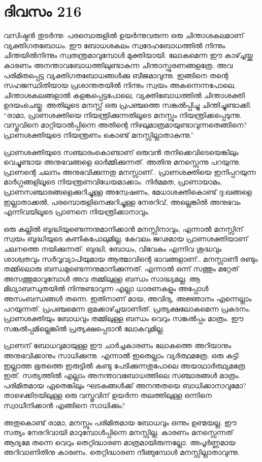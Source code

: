 \section{ദിവസം 216}


വസിഷ്ഠൻ തുടർന്നു: പരമ്പൊരുളിൽ ഉയർന്നുവരുന്ന ഒരു ചിന്താശകലമാണ്‌ വ്യക്തിഗതബോധം. ഈ ബോധശകലം സ്വദേഹബോധത്തിൽ നിന്നും ചിന്തയിൽനിന്നും സ്വതന്ത്രമാവുമ്പോൾ മുക്തിയായി. ലോകമെന്ന ഈ കാഴ്ച്ചയ്ക്കു കാരണം അനന്താവബോധത്തിലുണ്ടാകുന്ന ചിന്താസ്ഫുരണങ്ങളത്രേ. അവ പരിമിതപ്പെട്ട വ്യക്തിഗതബോധങ്ങൾക്കു ബീജമാവുന്നു. ഇങ്ങിനെ  തന്റെ സഹജസ്ഥിതിയായ പ്രശാന്തതയിൽ നിന്നും സ്വയം അകന്നെന്നപോലെ, ചിന്താശകലങ്ങളാൽ കളങ്കപ്പെട്ടപോലെ, വ്യക്തിബോധത്തിൽ ചിന്താശക്തി ഉദയംചെയ്തു. അതിലൂടെ മനസ്സ് ഒരു പ്രപഞ്ചത്തെ സങ്കല്‍പ്പിച്ചു ചിന്തിച്ചുണ്ടാക്കി. “രാമാ, പ്രാണശക്തിയെ നിയന്ത്രിക്കുന്നതിലൂടെ മനസ്സും നിയന്ത്രിക്കപ്പെടുന്നു. വസ്തുവിനെ മാറ്റിയാൽപ്പിന്നെ അതിന്റെ നിഴലുമാത്രമായുണ്ടാവുന്നതെങ്ങിനെ? പ്രാണശക്തിയുടെ നിയന്ത്രണം കൊണ്ട് മനസ്സില്ലാതാകുന്നു.”

പ്രാണശക്തിയുടെ സഞ്ചാരംകൊണ്ടാണ്‌ ഒരുവൻ തനിക്കെവിടെയെങ്കിലും വെച്ചുണ്ടായ അനുഭവങ്ങളെ ഓർമ്മിക്കുന്നത്. അതിനു മനസ്സെന്നു പറയുന്നു. പ്രാണന്റെ ചലനം അനുഭവിക്കുന്നതു മനസ്സാണ്‌.. പ്രാണശക്തിയെ ഇനിപ്പറയുന്ന മാർഗ്ഗങ്ങളിലൂടെ നിയന്ത്രണവിധേയമാക്കാം. നിർമമത, പ്രാണായാമം, പ്രാണസഞ്ചാരങ്ങളെക്കുറിച്ചുള്ള അന്വേഷണം, മേധാശക്തികൊണ്ട് ദു:ഖങ്ങളെ ഇല്ലാതാക്കൽ, പരമ്പൊരുളിനെക്കുറിച്ചുള്ള നേരറിവ്, അല്ലെങ്കിൽ അനുഭവം എന്നിവയിലൂടെ പ്രാണനെ നിയന്ത്രിക്കാനാവും.

ഒരു കല്ലിൽ ബുദ്ധിയുണ്ടെന്നനുമാനിക്കാൻ മനസ്സിനാവും, എന്നാൽ മനസ്സിന്‌ സ്വയം ബുദ്ധിയുടെ കണികപോലുമില്ല. കേവലം ജഢമായ പ്രാണശക്തിയാണ്‌ ചലനത്തെ നയിക്കുന്നത്. ബുദ്ധി, ബോധം, വിവേകം എന്നിവ ശുദ്ധവും ശാശ്വതവും സർവ്വവ്യാപിയുമായ ആത്മാവിന്റെ ഭാവങ്ങളാണ്‌.. മനസ്സാണീ രണ്ടും തമ്മിലൊരു ബന്ധമുണ്ടെന്നനുമാനിക്കുന്നത്. എന്നാൽ ഒന്ന് സത്തും മറ്റേത് അസത്തുമാവുമ്പോൾ അവ തമ്മിലുള്ള ബന്ധം സാദ്ധ്യമല്ല. ആ മിഥ്യാബന്ധുതയിൽ നിന്നുണ്ടാവുന്ന എല്ലാ ധാരണകളും അപ്പോള്‍ അസംബന്ധങ്ങൾ തന്നെ. ഇതിനാണ്‌ മായ, അവിദ്യ, അജ്ഞാനം എന്നെല്ലാം പറയുന്നത്. പ്രപഞ്ചമെന്ന ഭ്രമക്കാഴ്ച്ചയാണിത്. പ്രത്യക്ഷലോകമെന്ന പ്രകടനം. പ്രാണശക്തിയും ബോധവും തമ്മിലുള്ള ബന്ധം വെറും സങ്കൽപ്പം മാത്രം. ഈ സങ്കൽപ്പമില്ലെങ്കിൽ പ്രത്യക്ഷപ്പെടാൻ ലോകവുമില്ല.

പ്രാണന്‌ ബോധവുമായുള്ള ഈ ചാർച്ചകാരണം ലോകത്തെ അറിയാനും അനുഭവിക്കാനും സാധിക്കുന്നു. എന്നാൽ ഇതെല്ലാം വ്യർത്ഥമത്രേ. ഒരു കുട്ടി ഇല്ലാത്ത ഭൂതത്തെ ഇരുട്ടിൽ കണ്ടു പേടിക്കുന്നതുപോലെ അയാഥാർത്ഥ്യമത്രേ ഇത്. സത്യത്തിൽ എല്ലാം അനന്താവബോധത്തിലെ സഞ്ചാരങ്ങൾ മാത്രം. പരിമിതമായ ഏതെങ്കിലും ഘടകങ്ങൾക്ക് അനന്തതയെ ബാധിക്കാനാവുമോ? താഴെക്കിടയിലുള്ള ഒരു വസ്തുവിന്‌ ഉയർന്ന തലത്തിലുള്ള ഒന്നിനെ സ്വാധീനിക്കാൻ എങ്ങിനെ സാധിക്കും?

അതുകൊണ്ട് രാമാ, മനസ്സും പരിമിതമായ ബോധവും ഒന്നും ഉണ്മയല്ല. ഈ സത്യം നേരറിവായി മാറുമ്പോൾപ്പിന്നെ മനസ്സില്ല. കാരണം മനസ്സെന്നത് ആദ്യമേ തന്നെ വെറും തെറ്റിദ്ധാരണ മാത്രമായിരുന്നല്ലോ. അപൂർണ്ണമായ അറിവാണിതിനു കാരണം. തെറ്റിദ്ധാരണ നീങ്ങുമ്പോൾ മനസ്സില്ലാതാവുന്നു. 

